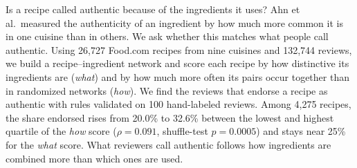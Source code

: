 Is a recipe called authentic because of the ingredients it uses? Ahn et al.\ measured the authenticity of an ingredient by how much more common it is in one cuisine than in others. We ask whether this matches what people call authentic. Using 26,727 Food.com recipes from nine cuisines and 132,744 reviews, we build a recipe--ingredient network and score each recipe by how distinctive its ingredients are (\emph{what}) and by how much more often its pairs occur together than in randomized networks (\emph{how}). We find the reviews that endorse a recipe as authentic with rules validated on 100 hand-labeled reviews. Among 4,275 recipes, the share endorsed rises from 20.0\% to 32.6\% between the lowest and highest quartile of the \emph{how} score ($\rho = 0.091$, shuffle-test $p = 0.0005$) and stays near 25\% for the \emph{what} score. What reviewers call authentic follows how ingredients are combined more than which ones are used.
